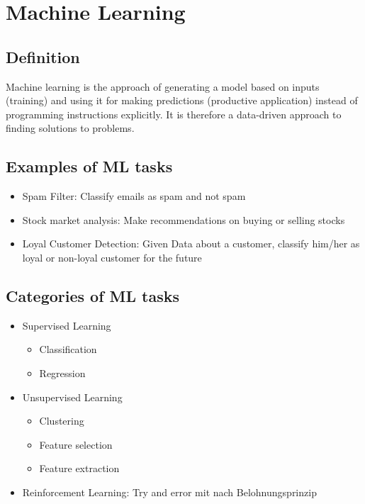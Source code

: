 \section{Machine Learning}

\subsection{Definition}

Machine learning is the approach of generating a model based on inputs (training) and using it for making predictions (productive application) instead of programming instructions explicitly. It is therefore a data-driven approach to finding solutions to problems.

\subsection{Examples of ML tasks}

\begin{itemize}
    \item Spam Filter: Classify emails as spam and not spam
    \item Stock market analysis: Make recommendations on buying or selling stocks
    \item Loyal Customer Detection: Given Data about a customer, classify him/her as loyal or non-loyal customer for the future
\end{itemize}

\subsection{Categories of ML tasks}

\begin{itemize}
    \item Supervised Learning
          \begin{itemize}
              \item Classification
              \item Regression
          \end{itemize}
    \item Unsupervised Learning
          \begin{itemize}
              \item Clustering
              \item Feature selection
              \item Feature extraction
          \end{itemize}
    \item Reinforcement Learning: Try and error mit nach Belohnungsprinzip
\end{itemize}

